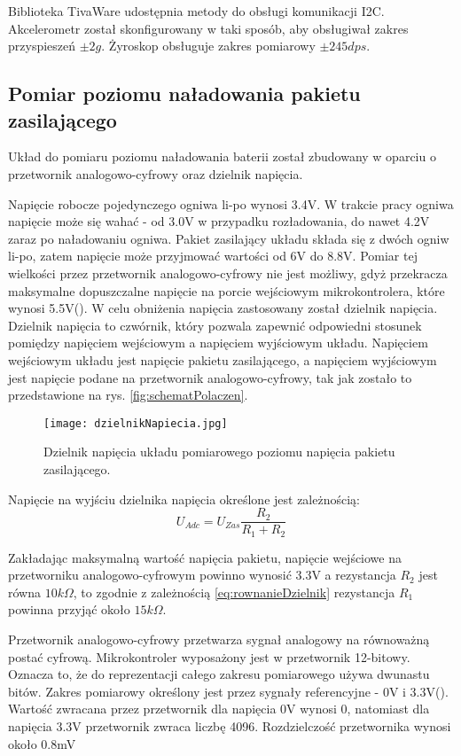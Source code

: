 Biblioteka TivaWare udostępnia metody do obsługi komunikacji I2C. Akcelerometr został skonfigurowany w taki sposób, aby obsługiwał zakres przyspieszeń $\pm2g$. Żyroskop obsługuje zakres pomiarowy $\pm245dps$.
\subsection{Pomiar poziomu naładowania pakietu zasilającego}

Układ do pomiaru poziomu naładowania baterii został zbudowany w oparciu o przetwornik analogowo-cyfrowy oraz dzielnik napięcia. 

Napięcie robocze pojedynczego ogniwa li-po wynosi 3.4V. W trakcie pracy ogniwa napięcie może się wahać - od 3.0V w przypadku rozładowania, do nawet 4.2V zaraz po naładowaniu ogniwa. Pakiet zasilający układu składa się z dwóch ogniw li-po, zatem napięcie może przyjmować wartości od 6V do 8.8V. Pomiar tej wielkości przez przetwornik analogowo-cyfrowy nie jest możliwy, gdyż przekracza maksymalne dopuszczalne napięcie na porcie wejściowym mikrokontrolera, które wynosi 5.5V(\cite{tiva}). W celu obniżenia napięcia zastosowany został dzielnik napięcia. Dzielnik napięcia to czwórnik, który pozwala zapewnić odpowiedni stosunek pomiędzy napięciem wejściowym a napięciem wyjściowym układu. Napięciem wejściowym układu jest napięcie pakietu zasilającego, a napięciem wyjściowym jest napięcie podane na przetwornik analogowo-cyfrowy, tak jak zostało to przedstawione na rys. \ref{fig:schematPolaczen}.
\begin{figure}
    \centering
    \texttt{[image: dzielnikNapiecia.jpg]}
    \caption{Dzielnik napięcia układu pomiarowego poziomu napięcia pakietu zasilającego.}
    \label{fig:równia}
\end{figure}

Napięcie na wyjściu dzielnika napięcia określone jest zależnością:
\begin{equation}
    U_{Adc}=U_{Zas}\frac{R_2}{R_1 + R_2}
    \label{eq:rownanieDzielnik}
\end{equation}

Zakładając maksymalną wartość napięcia pakietu, napięcie wejściowe na przetworniku analogowo-cyfrowym powinno wynosić 3.3V a rezystancja $R_2$ jest równa $10k\Omega$, to zgodnie z zależnością \ref{eq:rownanieDzielnik} rezystancja $R_1$ powinna przyjąć około $15k\Omega$.

Przetwornik analogowo-cyfrowy przetwarza sygnał analogowy na równoważną postać cyfrową. Mikrokontroler wyposażony jest w przetwornik 12-bitowy. Oznacza to, że do reprezentacji całego zakresu pomiarowego używa dwunastu bitów. Zakres pomiarowy określony jest przez sygnały referencyjne - 0V i 3.3V(\cite{tiva}). Wartość zwracana przez przetwornik dla napięcia 0V wynosi 0, natomiast dla napięcia 3.3V przetwornik zwraca liczbę 4096. Rozdzielczość przetwornika wynosi około 0.8mV

